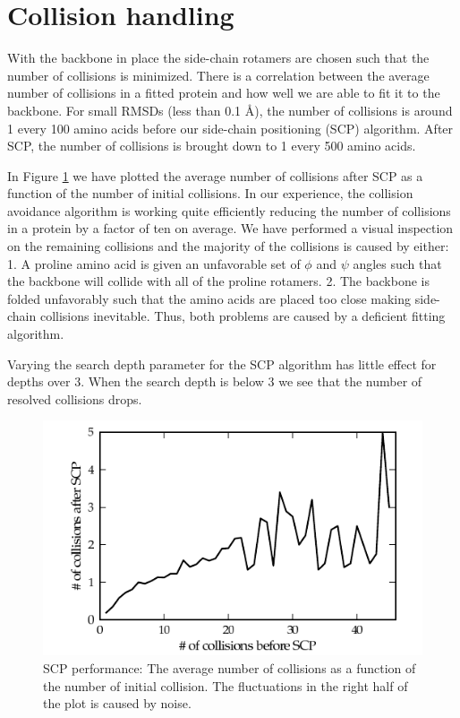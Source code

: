 \section{Collision handling}
With the backbone in place the side-chain rotamers are chosen such that the number of collisions is minimized.
There is a correlation between the average number of collisions in a fitted protein and how well we are able to fit it to the backbone. 
For small RMSDs (less than 0.1 Å), the number of collisions is around 1 every 100 amino acids before our side-chain positioning (SCP) algorithm.
After SCP, the number of collisions is brought down to 1 every 500 amino acids.

In Figure \ref{fig:plot_scp} we have plotted the average number of collisions after SCP as a function of the number of initial collisions.
In our experience, the collision avoidance algorithm is working quite efficiently reducing the number of collisions in a protein by a factor of ten on average. 
We have performed a visual inspection on the remaining collisions and the majority of the collisions is caused by either: 
1. A proline amino acid is given an unfavorable set of $\phi$ and $\psi$ angles such that the backbone will collide with all of the proline rotamers.
2. The backbone is folded unfavorably such that the amino acids are placed too close making side-chain collisions inevitable.
Thus, both problems are caused by a deficient fitting algorithm.

Varying the search depth parameter for the SCP algorithm has little effect for depths over 3.
When the search depth is below 3 we see that the number of resolved collisions drops.

\label{sec:evaluation_handling_side-chains}
\begin{figure}
	\centering
	\hspace*{-3.5mm}\includegraphics[width=1.1\columnwidth]{figures/plot_scp}
	\caption{SCP performance: The average number of collisions as a function of the number of initial collision. The fluctuations in the right half of the plot is caused by noise.}
	\label{fig:plot_scp}
\end{figure}

